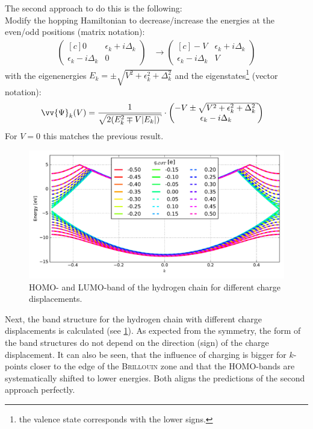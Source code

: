 The second approach to do this is the following:\\
Modify the hopping Hamiltonian to decrease/increase the energies at the even/odd positions (matrix notation):
\begin{align}
\begin{pmatrix*}[c]
0 & \epsilon_k + i \Delta_k \\
\epsilon_k - i \Delta_k & 0
\end{pmatrix*} 
&\to 
\begin{pmatrix*}[c]
-V & \epsilon_k + i \Delta_k \\
\epsilon_k - i \Delta_k & V
\end{pmatrix*}
\end{align}
with the eigenenergies $E_k = \pm \sqrt{V^2+\epsilon_k^2+\Delta_k^2}$ and the eigenstates\footnote{the valence state corresponds with the lower signs.} (vector notation):
\begin{align}
\vv{\Psi}_k(V) &= \frac{1}{\sqrt{2\left(E_k^2\mp V|E_k|\right)}}\cdot \begin{pmatrix*}[c]
-V\pm \sqrt{V^2+\epsilon_k^2+\Delta_k^2}\\
\epsilon_k - i \Delta_k
\end{pmatrix*}
\end{align}
For $V=0$ this matches the previous result.\\
\begin{figure}
	\centering
	\includegraphics[width = 12cm]{Images/Hydrogen/charging/band_structure_q_1}
	\caption{HOMO- and LUMO-band of the hydrogen chain for different charge displacements.}
	\label{image_hydrogen_charged_bands}
\end{figure}
Next, the band structure for the hydrogen chain with different charge displacements is calculated (see \cref{image_hydrogen_charged_bands}). As expected from the symmetry, the form of the band structures do not depend on the direction (sign) of the charge displacement. It can also be seen, that the influence of charging is bigger for $k$-points closer to the edge of the \textsc{Brillouin} zone and that the HOMO-bands are systematically shifted to lower energies. Both aligns the predictions of the second approach perfectly.

